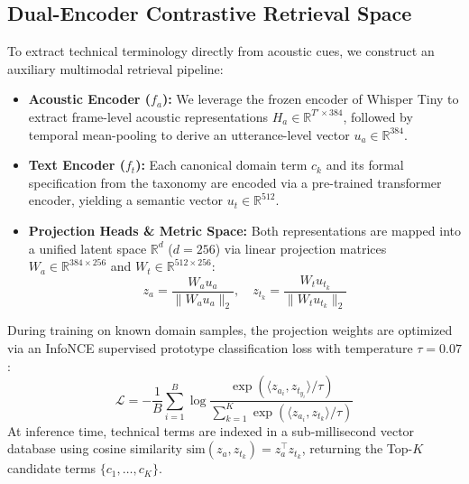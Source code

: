 \documentclass[11pt,conference,onecolumn]{IEEEtran}
\begin{document}
\subsection{Dual-Encoder Contrastive Retrieval Space}
To extract technical terminology directly from acoustic cues, we construct an auxiliary multimodal retrieval pipeline:
\begin{itemize}
    \item \textbf{Acoustic Encoder ($f_a$):} We leverage the frozen encoder of Whisper Tiny to extract frame-level acoustic representations $H_a \in \mathbb{R}^{T' \times 384}$, followed by temporal mean-pooling to derive an utterance-level vector $u_a \in \mathbb{R}^{384}$.
    \item \textbf{Text Encoder ($f_t$):} Each canonical domain term $c_k$ and its formal specification from the taxonomy are encoded via a pre-trained transformer encoder, yielding a semantic vector $u_t \in \mathbb{R}^{512}$.
    \item \textbf{Projection Heads & Metric Space:} Both representations are mapped into a unified latent space $\mathbb{R}^d$ ($d=256$) via linear projection matrices $W_a \in \mathbb{R}^{384 \times 256}$ and $W_t \in \mathbb{R}^{512 \times 256}$:
    \begin{equation}
    z_a = \frac{W_a u_a}{\|W_a u_a\|_2}, \quad z_{t_k} = \frac{W_t u_{t_k}}{\|W_t u_{t_k}\|_2}
    \end{equation}
\end{itemize}
During training on known domain samples, the projection weights are optimized via an InfoNCE supervised prototype classification loss with temperature $\tau = 0.07$:
\begin{equation}
\mathcal{L} = -\frac{1}{B}\sum_{i=1}^B \log \frac{\exp(\langle z_{a_i}, z_{t_{y_i}}\rangle / \tau)}{\sum_{k=1}^K \exp(\langle z_{a_i}, z_{t_k}\rangle / \tau)}
\end{equation}
At inference time, technical terms are indexed in a sub-millisecond vector database using cosine similarity $\text{sim}(z_a, z_{t_k}) = z_a^\top z_{t_k}$, returning the Top-$K$ candidate terms $\{c_1, \dots, c_K\}$.
\end{document}
